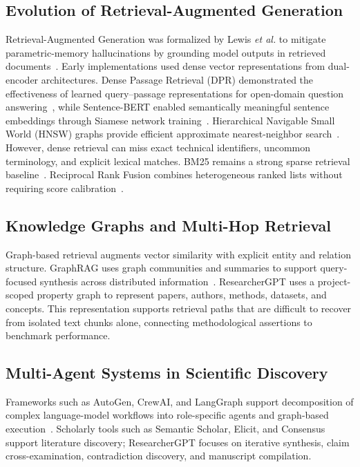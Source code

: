 \documentclass[conference]{IEEEtran}
\begin{document}
\subsection{Evolution of Retrieval-Augmented Generation}
Retrieval-Augmented Generation was formalized by Lewis \textit{et al.} to mitigate parametric-memory hallucinations by grounding model outputs in retrieved documents~\cite{lewis2020rag}. Early implementations used dense vector representations from dual-encoder architectures. Dense Passage Retrieval (DPR) demonstrated the effectiveness of learned query--passage representations for open-domain question answering~\cite{karpukhin2020dpr}, while Sentence-BERT enabled semantically meaningful sentence embeddings through Siamese network training~\cite{reimers2019sbert}. Hierarchical Navigable Small World (HNSW) graphs provide efficient approximate nearest-neighbor search~\cite{malkov2020hnsw}. However, dense retrieval can miss exact technical identifiers, uncommon terminology, and explicit lexical matches. BM25 remains a strong sparse retrieval baseline~\cite{robertson2009bm25}. Reciprocal Rank Fusion combines heterogeneous ranked lists without requiring score calibration~\cite{cormack2009rrf}.

\subsection{Knowledge Graphs and Multi-Hop Retrieval}
Graph-based retrieval augments vector similarity with explicit entity and relation structure. GraphRAG uses graph communities and summaries to support query-focused synthesis across distributed information~\cite{edge2024graphrag}. ResearcherGPT uses a project-scoped property graph to represent papers, authors, methods, datasets, and concepts. This representation supports retrieval paths that are difficult to recover from isolated text chunks alone, connecting methodological assertions to benchmark performance.

\subsection{Multi-Agent Systems in Scientific Discovery}
Frameworks such as AutoGen, CrewAI, and LangGraph support decomposition of complex language-model workflows into role-specific agents and graph-based execution~\cite{wu2023autogen,moura2024crewai,langgraph2024}. Scholarly tools such as Semantic Scholar, Elicit, and Consensus support literature discovery; ResearcherGPT focuses on iterative synthesis, claim cross-examination, contradiction discovery, and manuscript compilation.
\end{document}
